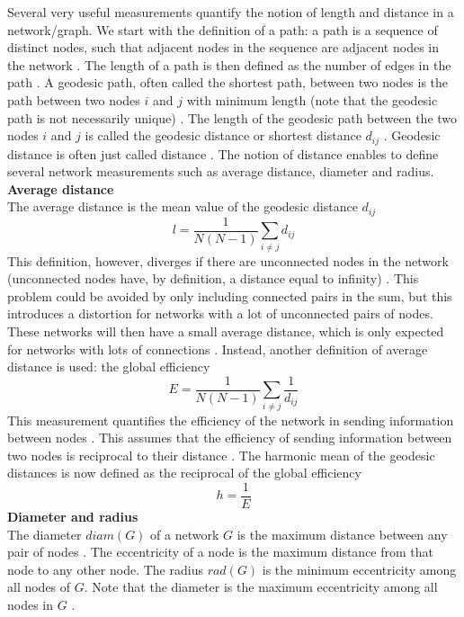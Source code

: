 \documentclass[11 pt , letterpaper , twoside , openright]{book}
\begin{document}
Several very useful measurements quantify the notion of length and distance in a network/graph. We start with the definition of a path: a path is a sequence of distinct nodes, such that adjacent nodes in the sequence are adjacent nodes in the network \cite{Goddard2010}. The length of a path is then defined as the number of edges in the path \cite{Goddard2010}. A geodesic path, often called the shortest path, between two nodes is the path between two nodes $i$ and $j$ with minimum length (note that the geodesic path is not necessarily unique) \cite{F.Costa2007}. The length of the geodesic path between the two nodes $i$ and $j$ is called the geodesic distance or shortest distance $d_{ij}$ \cite{F.Costa2007}. Geodesic distance is often just called distance \cite{Goddard2010}. The notion of distance enables to define several network measurements such as average distance, diameter and radius.\\  
\newline
\newline
\textbf{Average distance}\\
\newline
The average distance is the mean value of the geodesic distance $d_{ij}$ \cite{F.Costa2007}
\begin{equation}\label{avdist}
	l = \frac{1}{N(N-1)} \sum_{i \neq j} d_{ij}
\end{equation}
This definition, however, diverges if there are unconnected nodes in the network (unconnected nodes have, by definition, a distance equal to infinity) \cite{F.Costa2007}. This problem could be avoided by only including connected pairs in the sum, but this introduces a distortion for networks with a lot of unconnected pairs of nodes. These networks will then have a small average distance, which is only expected for networks with lots of connections \cite{F.Costa2007}. Instead, another definition of average distance is used: the global efficiency \cite{F.Costa2007}
\begin{equation}
	E = \frac{1}{N(N-1)} \sum_{i \neq j} \frac{1}{d_{ij}}
\end{equation}
This measurement quantifies the efficiency of the network in sending information between nodes \cite{F.Costa2007}. This assumes that the efficiency of sending information between two nodes is reciprocal to their distance \cite{F.Costa2007}. The harmonic mean of the geodesic distances is now defined as the reciprocal of the global efficiency
\begin{equation}
 	h = \frac{1}{E}
\end{equation}
\newline
\textbf{Diameter and radius}\\
\newline
The diameter $diam(G)$ of a network $G$ is the maximum distance between any pair of nodes \cite{Goddard2010}. The eccentricity of a node is the maximum distance from that node to any other node. The radius $rad(G)$ is the minimum eccentricity among all nodes of $G$. Note that the diameter is the maximum eccentricity among all nodes in $G$ \cite{Goddard2010}.
\end{document}
